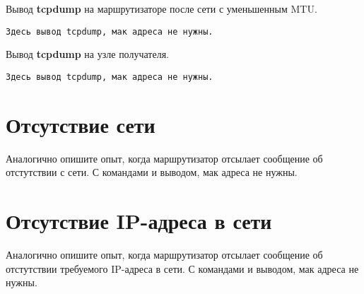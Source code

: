 \documentclass[a4paper,12pt]{article}
\begin{document}
Вывод \textbf{tcpdump} на маршрутизаторе после сети с уменьшенным MTU.


\begin{Verbatim}
Здесь вывод tcpdump, мак адреса не нужны.
\end{Verbatim}


Вывод \textbf{tcpdump} на узле получателя.

\begin{Verbatim}
Здесь вывод tcpdump, мак адреса не нужны.
\end{Verbatim}


\section{Отсутствие сети}

Аналогично опишите опыт, когда маршрутизатор отсылает сообщение об отстутствии с сети.
С командами и выводом, мак адреса не нужны.


\section{Отсутствие IP-адреса в сети}

Аналогично опишите опыт, когда маршрутизатор отсылает сообщение об отстутствии требуемого IP-адреса в сети.
С командами и выводом, мак адреса не нужны.
\end{document}
